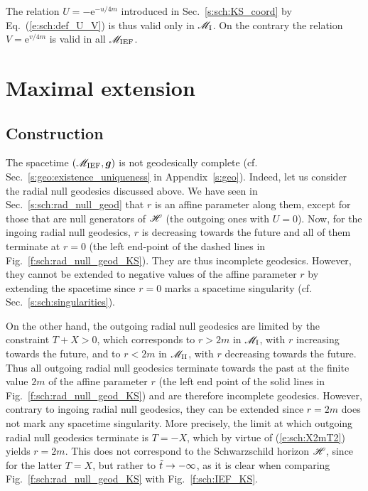 \begin{remark}
The relation $U = - \mathrm{e}^{-u/4m}$ introduced in Sec.~\ref{s:sch:KS_coord}
by Eq.~(\ref{e:sch:def_U_V}) is thus valid only in $\mathscr{M}_{\rm I}$. On the
contrary the relation $V = \mathrm{e}^{v/4m}$ is valid in all $\mathscr{M}_{\rm IEF}$.
\end{remark}

\section{Maximal extension} \label{s:sch:max_extens}

\subsection{Construction} \label{s:sch:max_extens_constr}

The spacetime $(\mathscr{M}_{\rm IEF}, \bm{g})$ is not geodesically complete (cf. Sec.~\ref{s:geo:existence_uniqueness} in Appendix~\ref{s:geo}).
Indeed, let us consider the radial null geodesics discussed above.
We have seen in Sec.~\ref{s:sch:rad_null_geod} that $r$ is an affine parameter
along them, except for those that are null generators of $\mathscr{H}$
(the outgoing ones with $U=0$).
Now, for the ingoing radial null geodesics, $r$ is decreasing towards the
future and all of them terminate at $r=0$ (the left end-point of the dashed
lines in Fig.~\ref{f:sch:rad_null_geod_KS}).
They are thus incomplete geodesics. However, they cannot be extended to
negative values of the affine parameter $r$ by extending the spacetime
since $r=0$ marks a spacetime singularity (cf. Sec.~\ref{s:sch:singularities}).

On the other hand, the outgoing radial null geodesics are limited by
the constraint $T+X > 0$, which corresponds to $r>2m$ in $\mathscr{M}_{\rm I}$, with $r$ increasing towards
the future, and to
$r<2m$ in $\mathscr{M}_{\rm II}$, with $r$ decreasing towards the future.
Thus all outgoing radial null geodesics terminate towards the past at the finite
value $2m$ of the affine parameter $r$
(the left end point of the solid lines in Fig.~\ref{f:sch:rad_null_geod_KS}) and are therefore incomplete geodesics.
However, contrary to ingoing radial null geodesics, they can be extended
since $r=2m$ does not mark any spacetime singularity.
More precisely, the limit at which outgoing radial null geodesics
terminate is $T=-X$, which by virtue of (\ref{e:sch:X2mT2}) yields $r=2m$.
This does not correspond to the Schwarzschild horizon $\mathscr{H}$, since for
the latter $T=X$, but rather to ${\tilde t}\rightarrow-\infty$,
as it is clear when comparing Fig.~\ref{f:sch:rad_null_geod_KS}
with Fig.~\ref{f:sch:IEF_KS}.


